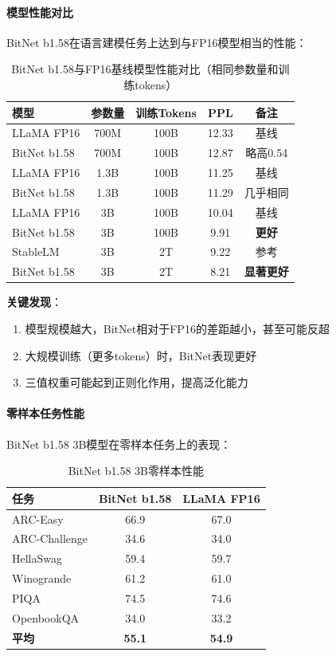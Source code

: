 \documentclass[12pt,a4paper]{article}
\begin{document}
\paragraph{模型性能对比}

BitNet b1.58在语言建模任务上达到与FP16模型相当的性能：

\begin{table}[H]
\centering
\caption{BitNet b1.58与FP16基线模型性能对比（相同参数量和训练tokens）}
\begin{tabular}{lcccc}
\toprule
\textbf{模型} & \textbf{参数量} & \textbf{训练Tokens} & \textbf{PPL} & \textbf{备注} \\
\midrule
LLaMA FP16 & 700M & 100B & 12.33 & 基线 \\
BitNet b1.58 & 700M & 100B & 12.87 & 略高0.54 \\
\midrule
LLaMA FP16 & 1.3B & 100B & 11.25 & 基线 \\
BitNet b1.58 & 1.3B & 100B & 11.29 & 几乎相同 \\
\midrule
LLaMA FP16 & 3B & 100B & 10.04 & 基线 \\
BitNet b1.58 & 3B & 100B & 9.91 & \textbf{更好} \\
\midrule
StableLM & 3B & 2T & 9.22 & 参考 \\
BitNet b1.58 & 3B & 2T & 8.21 & \textbf{显著更好} \\
\bottomrule
\end{tabular}
\end{table}

\textbf{关键发现}：
\begin{enumerate}
    \item 模型规模越大，BitNet相对于FP16的差距越小，甚至可能反超
    \item 大规模训练（更多tokens）时，BitNet表现更好
    \item 三值权重可能起到正则化作用，提高泛化能力
\end{enumerate}

\paragraph{零样本任务性能}

BitNet b1.58 3B模型在零样本任务上的表现：

\begin{table}[H]
\centering
\caption{BitNet b1.58 3B零样本性能}
\begin{tabular}{lcc}
\toprule
\textbf{任务} & \textbf{BitNet b1.58} & \textbf{LLaMA FP16} \\
\midrule
ARC-Easy & 66.9 & 67.0 \\
ARC-Challenge & 34.6 & 34.0 \\
HellaSwag & 59.4 & 59.7 \\
Winogrande & 61.2 & 61.0 \\
PIQA & 74.5 & 74.6 \\
OpenbookQA & 34.0 & 33.2 \\
\textbf{平均} & \textbf{55.1} & \textbf{54.9} \\
\bottomrule
\end{tabular}
\end{table}
\end{document}
